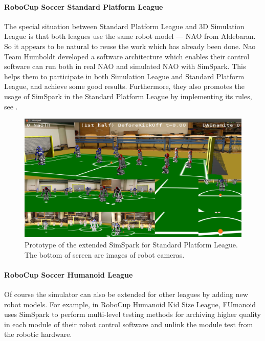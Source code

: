 \documentclass{llncs}
\begin{document}
\paragraph{RoboCup Soccer Standard Platform League}

The special situation between Standard Platform League and 3D Simulation League is that both leagues use the same robot model — NAO from Aldebaran.
So it appears to be natural to reuse the work which has already been done.
Nao Team Humboldt developed a software architecture\cite{SCPR2010} which enables their control software can run both in real NAO and simulated NAO with SimSpark. This helps them to participate in both Simulation League and Standard Platform League, and achieve some good results.
Furthermore, they also promotes the usage of SimSpark in the Standard Platform League by implementing its rules, see .

\begin{figure}
  \centering
  \includegraphics[width = 0.9\columnwidth]{simspark-spl}
  \caption{Prototype of the extended SimSpark for Standard Platform League.
    The bottom of screen are images of robot cameras.}
  \label{f:simspark-spl}
\end{figure}

\paragraph{RoboCup Soccer Humanoid League}
Of course the simulator can also be extended for other leagues by adding new robot models.
For example, in RoboCup Humanoid Kid Size League, FUmanoid\cite{Donat2012} uses
SimSpark to perform multi-level testing methods for archiving higher
quality in each module of their robot control software and unlink the
module test from the robotic hardware.
\end{document}

